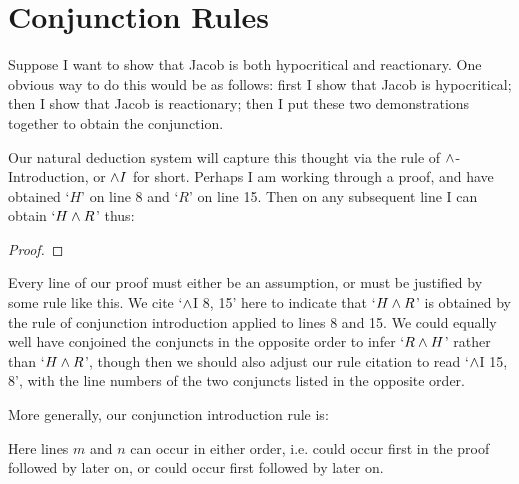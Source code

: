 \section{Conjunction Rules}
Suppose I want to show that Jacob is both hypocritical and reactionary. One obvious way to do this would be as follows: first I show that Jacob is hypocritical; then I show that Jacob is reactionary; then I put these two demonstrations together to obtain the conjunction.

Our natural deduction system will capture this thought via the rule of $\wedge$-Introduction, or $\wedge I$ for short. Perhaps I am working through a proof, and have obtained `$H$' on line 8 and `$R$' on line 15. Then on any subsequent line I can obtain `$H \wedge R$' thus:
\begin{proof}
	\have[\ ]{}{\vdots}
	\have[\ ]{}{\vdots}
	 
\end{proof}
Every line of our proof must either be an assumption, or must be justified by some rule like this. We cite `$\wedge$I 8, 15' here to indicate that `$H \wedge R$' is obtained by the rule of conjunction introduction applied to lines 8 and 15. We could equally well have conjoined the conjuncts in the opposite order to infer `$R \wedge H$' rather than `$H \wedge R$', though then we should also adjust our rule citation to read `$\wedge$I 15, 8', with the line numbers of the two conjuncts listed in the opposite order.

More generally, our conjunction introduction rule is:

Here lines $m$ and $n$ can occur in either order, i.e.  could occur first in the proof followed by  later on, or  could occur first followed by  later on.


